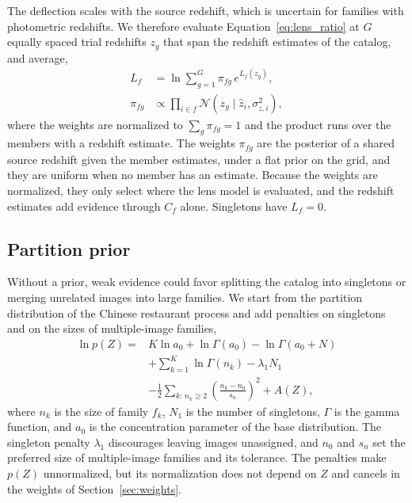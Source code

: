 \documentclass[twocolumn,twocolappendix,linenumbers]{aastex701}
\newcommand{\N}{\mathcal{N}}
\begin{document}
The deflection scales with the source redshift, which is uncertain for families with photometric redshifts.
We therefore evaluate Equation~\ref{eq:lens_ratio} at $G$ equally spaced trial redshifts $z_g$ that span the redshift estimates of the catalog, and average,
\begin{equation}
\begin{aligned}
L_f&=\ln\sum_{g=1}^{G}\pi_{fg}\,e^{L_f(z_g)},\\
\pi_{fg}&\propto\prod_{i\in f}\N(z_g\mid\hat z_i,\sigma_{z,i}^2),
\end{aligned}
\label{eq:redshift_average}
\end{equation}
where the weights are normalized to $\sum_g\pi_{fg}=1$ and the product runs over the members with a redshift estimate.
The weights $\pi_{fg}$ are the posterior of a shared source redshift given the member estimates, under a flat prior on the grid, and they are uniform when no member has an estimate.
Because the weights are normalized, they only select where the lens model is evaluated, and the redshift estimates add evidence through $C_f$ alone.
Singletons have $L_f=0$.

\subsection{Partition prior}
\label{sec:prior}
Without a prior, weak evidence could favor splitting the catalog into singletons or merging unrelated images into large families.
We start from the partition distribution of the Chinese restaurant process \citep{Pitman1995} and add penalties on singletons and on the sizes of multiple-image families,
\begin{equation}
\begin{aligned}
\ln p(Z)={}&K\ln a_0+\ln\Gamma(a_0)-\ln\Gamma(a_0+N)\\
&+\sum_{k=1}^{K}\ln\Gamma(n_k)-\lambda_1N_1\\
&-\frac12\sum_{k:\,n_k\ge2}\left(\frac{n_k-n_0}{s_n}\right)^2+A(Z),
\end{aligned}
\label{eq:prior}
\end{equation}
where $n_k$ is the size of family $f_k$, $N_1$ is the number of singletons, $\Gamma$ is the gamma function, and $a_0$ is the concentration parameter of the base distribution.
The singleton penalty $\lambda_1$ discourages leaving images unassigned, and $n_0$ and $s_n$ set the preferred size of multiple-image families and its tolerance.
The penalties make $p(Z)$ unnormalized, but its normalization does not depend on $Z$ and cancels in the weights of Section~\ref{sec:weights}.
\end{document}
